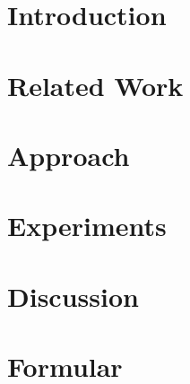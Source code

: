 \documentclass[]{report}
\title{}
\author{Jingyuan Sha}
\begin{document}
\maketitle

\begin{abstract}
\end{abstract}



\newpage
\chapter{Introduction}



\newpage
\chapter{Related Work}


\newpage
\chapter{Approach}


\newpage
\chapter{Experiments}


\newpage
\chapter{Discussion}


\newpage
\chapter{Formular}



\medskip



\end{document}
